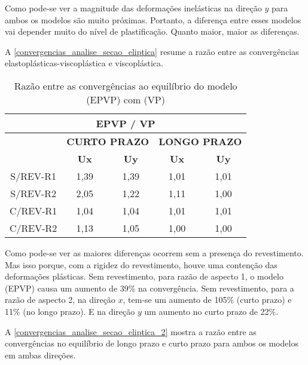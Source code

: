 Como pode-se ver a magnitude das deformações inelásticas na direção $y$ para ambos os modelos são muito próximas. Portanto, a diferença entre esses modelos vai depender muito do nível de plastificação. Quanto maior, maior as diferenças.

A \autoref{convergencias_analise_secao_eliptica} resume a razão entre as convergências elastoplásticas-viscoplástica e viscoplástica.

\begin{table}[H]
	\caption{Razão entre as convergências ao equilíbrio do modelo (EPVP) com (VP)}
	\label{convergencias_analise_secao_eliptica}
	\centering
	\small
	\renewcommand{\arraystretch}{1.25}
	\begin{tabular}{c c c c c}
		\hline
		\multicolumn{5}{c}{\textbf{EPVP / VP}}\\	
		\hline
		\multicolumn{1}{c}{} &
		\multicolumn{2}{c}{\textbf{CURTO PRAZO}} &
		\multicolumn{2}{c}{\textbf{LONGO PRAZO}}	\\
		\multicolumn{1}{c}{} &
		\multicolumn{1}{c}{\textbf{Ux}} &
		\multicolumn{1}{c}{\textbf{Uy}} &
		\multicolumn{1}{c}{\textbf{Ux}} &
		\multicolumn{1}{c}{\textbf{Uy}} \\
		\hline
		S/REV-R1	 &	1,39 &	1,39 &	1,01 &	1,01 \\
		S/REV-R2	 &	2,05 &	1,22 &	1,11 &	1,00 \\
		C/REV-R1	 &	1,04 &	1,04 &	1,01 &	1,01 \\
		C/REV-R2	 &	1,13 &	1,05 &	1,00 &	1,00 \\
		\hline
	\end{tabular}
	\normalsize
\end{table}

Como pode-se ver as maiores diferenças ocorrem sem a presença do revestimento. Mas isso porque, com a rigidez do revestimento, houve uma contenção das deformações plásticas. Sem revestimento, para razão de aspecto 1, o modelo (EPVP) causa um aumento de 39\% na convergência. Sem revestimento, para a razão de aspecto 2, na direção $x$, tem-se um aumento de 105\% (curto prazo) e 11\% (no longo prazo). E na direção $y$ um aumento no curto prazo de 22\%.

A \autoref{convergencias_analise_secao_eliptica_2} mostra a razão entre as convergências no equilíbrio de longo prazo e curto prazo para ambos os modelos em ambas direções.

